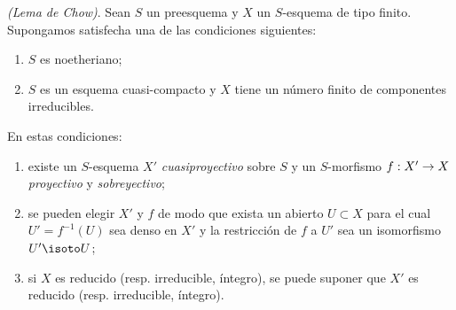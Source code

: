 \documentclass[oneside,10pt]{amsart}
\makeatletter
\newcommand{\ega@arrow}[2]{\mathchoice{#1}{#2}{#2}{#2}}
\renewcommand{\to}{\ega@arrow{\longrightarrow}{\rightarrow}}
\let\EGAOriginalLabel\label
\renewcommand{\label}[1]{\phantomsection\EGAOriginalLabel{#1}}
\makeatother
\begin{document}
\begin{theorem}[5.6.1]
\label{II.5.6.1}
\emph{(Lema de Chow)}.
Sean $S$ un preesquema y $X$ un $S$-esquema de tipo finito.
Supongamos satisfecha una de las condiciones siguientes:
\begin{enumerate}
  \item[{\rm(a)}] $S$ es noetheriano;
  \item[{\rm(b)}] $S$ es un esquema cuasi-compacto y $X$ tiene un número finito de componentes irreducibles.
\end{enumerate}
En estas condiciones:
\begin{enumerate}
  \item[{\rm(i)}] existe un $S$-esquema $X'$ \emph{cuasiproyectivo} sobre $S$ y un $S$-morfismo $f:X'\to X$ \emph{proyectivo} y \emph{sobreyectivo};
  \item[{\rm(ii)}] se pueden elegir $X'$ y $f$ de modo que exista un abierto $U\subset X$ para el cual $U'=f^{-1}(U)$ sea denso en $X'$ y la restricción de $f$ a $U'$ sea un isomorfismo $U'\isoto U$;
  \item[{\rm(iii)}] si $X$ es reducido \textup{(resp.} irreducible, íntegro), se puede suponer que $X'$ es reducido \textup{(resp.} irreducible, íntegro).
\end{enumerate}
\end{theorem}
\end{document}

